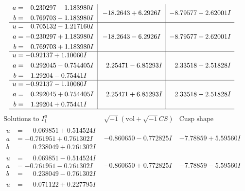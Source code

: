 \documentclass[1p]{elsarticle_modified}
\theoremstyle{definition}
\newcommand{\I}{\sqrt{-1}}
\begin{document}
$$\begin{array}{c|c|c}
\begin{aligned}
a &= -0.230297 - 1.183980 I \\
b &= \phantom{-}0.769703 - 1.183980 I\end{aligned}
 & -18.2643 + 6.2926 I & -8.79577 - 2.62001 I \\ \hline\begin{aligned}
u &= \phantom{-}0.705132 - 1.217160 I \\
a &= -0.230297 + 1.183980 I \\
b &= \phantom{-}0.769703 + 1.183980 I\end{aligned}
 & -18.2643 - 6.2926 I & -8.79577 + 2.62001 I \\ \hline\begin{aligned}
u &= -0.92137 + 1.10060 I \\
a &= \phantom{-}0.292045 - 0.754405 I \\
b &= \phantom{-}1.29204 - 0.75441 I\end{aligned}
 & \phantom{-}2.25471 - 6.85293 I & \phantom{-}2.33518 + 2.51828 I \\ \hline\begin{aligned}
u &= -0.92137 - 1.10060 I \\
a &= \phantom{-}0.292045 + 0.754405 I \\
b &= \phantom{-}1.29204 + 0.75441 I\end{aligned}
 & \phantom{-}2.25471 + 6.85293 I & \phantom{-}2.33518 - 2.51828 I\\
 \hline 
 \end{array}$$\newpage$$\begin{array}{c|c|c}  
\text{Solutions to }I^u_{1}& \I (\text{vol} + \sqrt{-1}CS) & \text{Cusp shape}\\
 \hline 
\begin{aligned}
u &= \phantom{-}0.069851 + 0.514524 I \\
a &= -0.761951 + 0.761302 I \\
b &= \phantom{-}0.238049 + 0.761302 I\end{aligned}
 & -0.860650 - 0.772825 I & -7.78859 + 5.59560 I \\ \hline\begin{aligned}
u &= \phantom{-}0.069851 - 0.514524 I \\
a &= -0.761951 - 0.761302 I \\
b &= \phantom{-}0.238049 - 0.761302 I\end{aligned}
 & -0.860650 + 0.772825 I & -7.78859 - 5.59560 I \\ \hline\begin{aligned}
u &= \phantom{-}0.071122 + 0.227795 I \\

\end{aligned}
\end{array}$$
\end{document}
